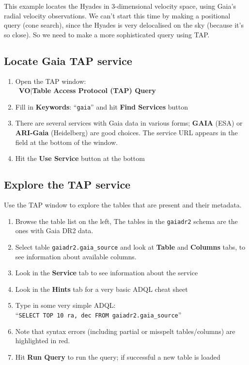 \documentclass{article}
\newcommand{\buttimg}[1]
           {\mbox{\vtop{\vskip-2ex\hbox{\texttt{[image: \#1]}}}}}
\newcommand{\lab}[1]{{\bf #1}}
\newcommand{\mb}[3]{\buttimg{#1}~\lab{#2}$\mid$\lab{#3}}
\newcommand{\entry}[2]{\lab{#1}: ``{\tt #2}''}
\begin{document}
This example locates the Hyades in 3-dimensional velocity space,
using Gaia's radial velocity observations.
We can't start this time by making a positional query (cone search),
since the Hyades is very delocalised on the sky (because it's so close).
So we need to make a more sophisticated query using TAP.

\subsection{Locate Gaia TAP service}

\begin{minipage}[t]{11cm}
  \raggedright

  \begin{enumerate}
  \item Open the TAP window: \\
        \mb{tap_button.png}{VO}{Table Access Protocol (TAP) Query}
  \item Fill in \entry{Keywords}{gaia} and hit \lab{Find Services} button
  \item There are several services with Gaia data in various forms;
        \lab{GAIA} (ESA) or \lab{ARI-Gaia} (Heidelberg) are good choices.
        The service URL appears in the field at the bottom of the window.
  \item Hit the \lab{Use Service} button at the bottom
  \end{enumerate}

  \subsection{Explore the TAP service}

  Use the TAP window to explore the tables that are present and
  their metadata.
  \begin{enumerate}
  \item Browse the table list on the left,
        The tables in the {\tt gaiadr2} schema are the ones with Gaia DR2 data.
  \item Select table {\tt gaiadr2.gaia\_source} and look at
        \lab{Table} and \lab{Columns} tabs,
        to see information about available columns.
  \item Look in the \lab{Service} tab to see information about the service
  \item Look in the \lab{Hints} tab for a very basic ADQL cheat sheet
  \item Type in some very simple ADQL:\\
        ``{\tt SELECT TOP 10 ra, dec FROM gaiadr2.gaia\_source}''
  \item Note that syntax errors (including partial or misspelt tables/columns)
        are highlighted in red.
  \item Hit \lab{Run Query} to run the query;
        if successful a new table is loaded
  \end{enumerate}


\end{minipage}
\end{document}
